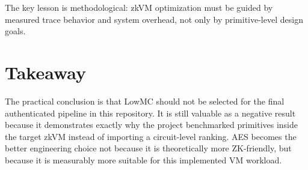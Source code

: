 The key lesson is methodological: zkVM optimization must be guided by measured
trace behavior and system overhead, not only by primitive-level design goals.

\section{Takeaway}

The practical conclusion is that LowMC should not be selected for the final
authenticated pipeline in this repository. It is still valuable as a negative
result because it demonstrates exactly why the project benchmarked primitives
inside the target zkVM instead of importing a circuit-level ranking. AES becomes
the better engineering choice not because it is theoretically more ZK-friendly,
but because it is measurably more suitable for this implemented VM workload.
